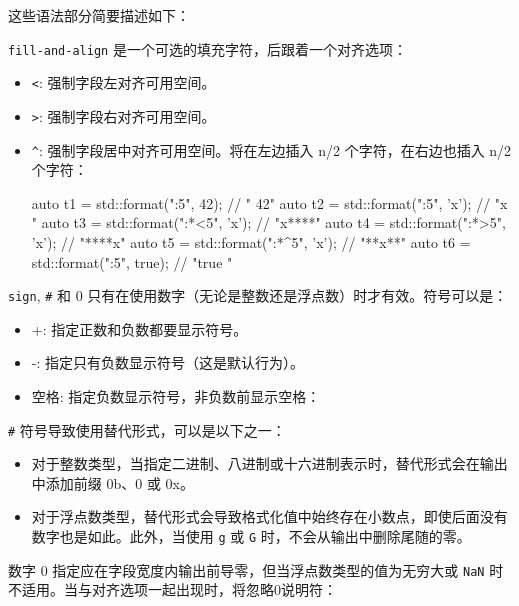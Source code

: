 这些语法部分简要描述如下：

\verb|fill-and-align| 是一个可选的填充字符，后跟着一个对齐选项：

\begin{itemize}
\item
\verb|<|: 强制字段左对齐可用空间。

\item
\verb|>|: 强制字段右对齐可用空间。

\item
\verb|^|: 强制字段居中对齐可用空间。将在左边插入 n/2 个字符，在右边也插入 n/2 个字符：

\begin{cpp}
auto t1 = std::format("{:5}", 42);    // "   42"
auto t2 = std::format("{:5}", 'x');   // "x    "
auto t3 = std::format("{:*<5}", 'x'); // "x****"
auto t4 = std::format("{:*>5}", 'x'); // "****x"
auto t5 = std::format("{:*^5}", 'x'); // "**x**"
auto t6 = std::format("{:5}", true);  // "true "
\end{cpp}

\end{itemize}

\verb|sign|, \verb|#| 和 0 只有在使用数字（无论是整数还是浮点数）时才有效。符号可以是：

\begin{itemize}
\item
+: 指定正数和负数都要显示符号。

\item
-: 指定只有负数显示符号（这是默认行为）。

\item
空格: 指定负数显示符号，非负数前显示空格：
\end{itemize}

\verb|#| 符号导致使用替代形式，可以是以下之一：

\begin{itemize}
\item
对于整数类型，当指定二进制、八进制或十六进制表示时，替代形式会在输出中添加前缀 0b、0 或 0x。

\item
对于浮点数类型，替代形式会导致格式化值中始终存在小数点，即使后面没有数字也是如此。此外，当使用 \verb|g| 或 \verb|G| 时，不会从输出中删除尾随的零。
\end{itemize}

数字 0 指定应在字段宽度内输出前导零，但当浮点数类型的值为无穷大或 \verb|NaN| 时不适用。当与对齐选项一起出现时，将忽略0说明符：


